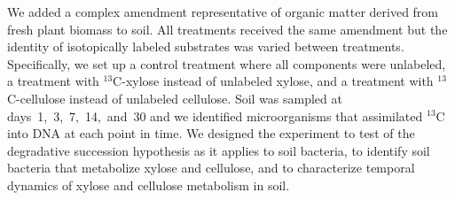 We added a complex amendment representative of organic
matter derived from fresh plant biomass to soil. All treatments received the same
amendment but the identity of isotopically labeled substrates was varied
between treatments. Specifically, we set up a control treatment where all
components were unlabeled, a treatment with $^{13}$C-xylose instead of
unlabeled xylose, and a treatment with $^{13}$C-cellulose instead of unlabeled
cellulose. Soil was sampled at days~1,~3,~7,~14,~and~30 and we identified
microorganisms that assimilated $^{13}$C into DNA at each point in time. We
designed the experiment to test of the degradative succession
hypothesis as it applies to soil bacteria, to identify soil bacteria that
metabolize xylose and cellulose, and to characterize temporal dynamics of
xylose and cellulose metabolism in soil. 
